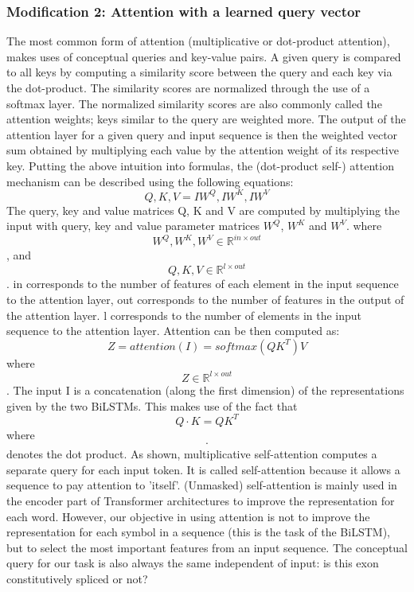 \subsubsection{Modification 2: Attention with a learned query vector}
The most common form of attention (multiplicative or dot-product attention), makes uses of conceptual queries and key-value pairs. A given query is compared to all keys by computing a similarity score between the query and each key via the dot-product. The similarity scores are normalized through the use of a softmax layer. The normalized similarity scores are also commonly called the attention weights; keys similar to the query are weighted more. The output of the attention layer for a given query and input sequence is then the weighted vector sum obtained by multiplying each value by the attention weight of its respective key.
Putting the above intuition into formulas, the (dot-product self-) attention mechanism can be described using the following equations:
$$Q, K, V = IW^Q, IW^K, IW^V$$
The query, key and value matrices Q, K and V are computed by multiplying the input with query, key and value parameter matrices $W^Q$, $W^K$ and $W^V$.
where $$W^Q,W^K, W^V \in \mathbb{R}^{in \times out}$$,
and $$Q,K, V \in \mathbb{R}^{l \times out}$$. in corresponds to the number of features of each element in the input sequence to the attention layer, out corresponds to the number of features in the output of the attention layer. l corresponds to the number of elements in the input sequence to the attention layer.
Attention can be then computed as:
$$Z = attention(I) = softmax(QK^T)V$$
where $$Z \in \mathbb{R}^{l \times out}$$. The input I is a concatenation (along the first dimension) of the representations given by the two BiLSTMs.
This makes use of the fact that $$Q\cdotp K = QK^T$$ where $$\cdotp$$ denotes the dot product.
As shown, multiplicative self-attention computes a separate query for each input token. It is called self-attention because it allows a sequence to pay attention to 'itself'. (Unmasked) self-attention is mainly used in the encoder part of Transformer architectures to improve the representation for each word.
However, our objective in using attention is not to improve the representation for each symbol in a sequence (this is the task of the BiLSTM), but to select the most important features from an input sequence. The conceptual query for our task is also always the same independent of input: is this exon constitutively spliced or not?
